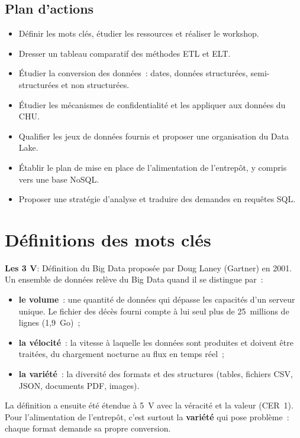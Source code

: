 \subsection*{Plan d'actions}
{}
\begin{itemize}
	\item Définir les mots clés, étudier les ressources et réaliser le workshop.
	\item Dresser un tableau comparatif des méthodes ETL et ELT.
	\item Étudier la conversion des données~: dates, données structurées, semi-structurées et non structurées.
	\item Étudier les mécanismes de confidentialité et les appliquer aux données du CHU.
	\item Qualifier les jeux de données fournis et proposer une organisation du Data Lake.
	\item Établir le plan de mise en place de l'alimentation de l'entrepôt, y compris vers une base NoSQL.
	\item Proposer une stratégie d'analyse et traduire des demandes en requêtes SQL.
\end{itemize}

\newpage
\section{Définitions des mots clés}

\noindent \textbf{Les 3 V}:
\noindent Définition du Big Data proposée par Doug Laney (Gartner) en 2001. Un ensemble de données relève du Big Data quand il se distingue par~:
\begin{itemize}
	\item \textbf{le volume}~: une quantité de données qui dépasse les capacités d'un serveur unique. Le fichier des décès fourni compte à lui seul plus de 25~millions de lignes (1,9~Go)~;
	\item \textbf{la vélocité}~: la vitesse à laquelle les données sont produites et doivent être traitées, du chargement nocturne au flux en temps réel~;
	\item \textbf{la variété}~: la diversité des formats et des structures (tables, fichiers CSV, JSON, documents PDF, images).
\end{itemize}
La définition a ensuite été étendue à 5~V avec la véracité et la valeur (CER~1). Pour l'alimentation de l'entrepôt, c'est surtout la \textbf{variété} qui pose problème~: chaque format demande sa propre conversion.

